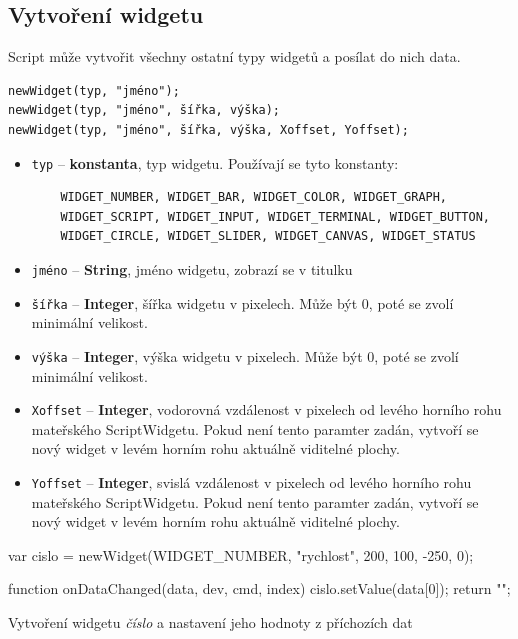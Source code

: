 \documentclass[12pt, a4paper, oneside]{article}
\newcommand{\It}{\textit}  %
\begin{document}
\subsection*{Vytvoření widgetu}

Script může vytvořit všechny ostatní typy widgetů a posílat do nich data. 
{\color{blue}
\begin{verbatim}newWidget(typ, "jméno");
newWidget(typ, "jméno", šířka, výška);
newWidget(typ, "jméno", šířka, výška, Xoffset, Yoffset);
\end{verbatim}
}

\begin{itemize}
    \item \verb|typ| -- {\bf konstanta}, typ widgetu. Používají se tyto konstanty:
    \begin{verbatim}
    WIDGET_NUMBER, WIDGET_BAR, WIDGET_COLOR, WIDGET_GRAPH,
    WIDGET_SCRIPT, WIDGET_INPUT, WIDGET_TERMINAL, WIDGET_BUTTON,
    WIDGET_CIRCLE, WIDGET_SLIDER, WIDGET_CANVAS, WIDGET_STATUS
    \end{verbatim}
    \item \verb/jméno/ -- {\bf String}, jméno widgetu, zobrazí se v titulku
    \item \verb/šířka/ -- {\bf Integer}, šířka widgetu v pixelech. Může být 0, poté se zvolí minimální velikost.
    \item \verb/výška/ -- {\bf Integer}, výška widgetu v pixelech. Může být 0, poté se zvolí minimální velikost.
    \item \verb/Xoffset/ -- {\bf Integer}, vodorovná vzdálenost v pixelech od levého horního rohu mateřského ScriptWidgetu. Pokud není tento paramter zadán, vytvoří se nový widget v levém horním rohu aktuálně viditelné plochy.
    \item \verb/Yoffset/ -- {\bf Integer}, svislá vzdálenost v pixelech od levého horního rohu mateřského ScriptWidgetu. Pokud není tento paramter zadán, vytvoří se nový widget v levém horním rohu aktuálně viditelné plochy.
\end{itemize}

\begin{listing}[H]
\begin{jscode}
var cislo = newWidget(WIDGET_NUMBER,
                "rychlost", 200, 100, -250, 0);

function onDataChanged(data, dev, cmd, index) {
    cislo.setValue(data[0]);
    return "";
}
\end{jscode}
\caption{Vytvoření widgetu \It{číslo} a nastavení jeho hodnoty z příchozích dat}
\end{listing}
\end{document}
